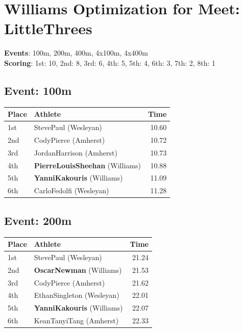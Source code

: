 \documentclass[11pt]{article}
\begin{document}
\section*{Williams Optimization for Meet: LittleThrees}

\textbf{Events}: 100m, 200m, 400m, 4x100m, 4x400m\\

\noindent\textbf{Scoring}: 1st: 10, 2nd: 8, 3rd: 6, 4th: 5, 5th: 4, 6th: 3, 7th: 2, 8th: 1\\

\subsection*{Event: 100m}
\begin{tabularx}{\linewidth}{lXr}
\toprule
Place & Athlete & Time \\
\midrule
1st & StevePaul (Wesleyan) & 10.60 \\
2nd & CodyPierce (Amherst) & 10.72 \\
3rd & JordanHarrison (Amherst) & 10.73 \\
4th & \textbf{PierreLouisSheehan} (Williams) & 10.88 \\
5th & \textbf{YanniKakouris} (Williams) & 11.09 \\
6th & CarloFedolfi (Wesleyan) & 11.28 \\
\bottomrule
\end{tabularx}

\subsection*{Event: 200m}
\begin{tabularx}{\linewidth}{lXr}
\toprule
Place & Athlete & Time \\
\midrule
1st & StevePaul (Wesleyan) & 21.24 \\
2nd & \textbf{OscarNewman} (Williams) & 21.53 \\
3rd & CodyPierce (Amherst) & 21.62 \\
4th & EthanSingleton (Wesleyan) & 22.01 \\
5th & \textbf{YanniKakouris} (Williams) & 22.07 \\
6th & KeanTanyiTang (Amherst) & 22.33 \\
\bottomrule
\end{tabularx}
\end{document}
